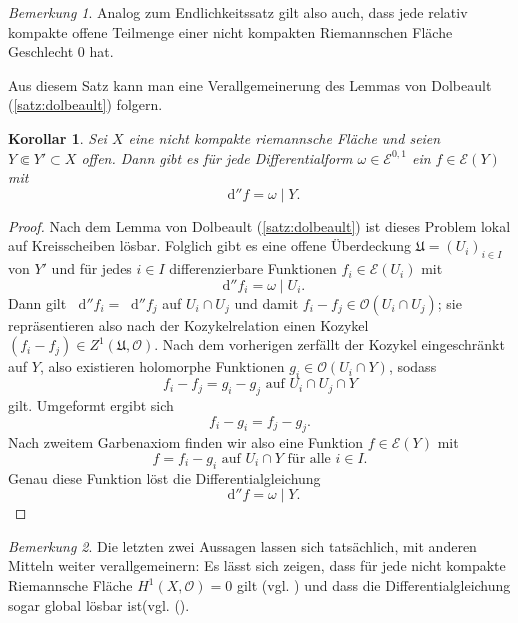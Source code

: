 \documentclass[11pt,a4paper,toc=bibliography]{scrartcl}
\theoremstyle{def}
\theoremstyle{thm}
\newtheorem{koro}[defi]{Korollar}
\theoremstyle{remark}
\newtheorem*{bem}{Bemerkung}
\newcommand*\dif{\mathop{}\!\mathrm{d}}\newcommand{\einschraenkung}{\,\rule[-5pt]{0.4pt}{12pt}\,{}} %
\begin{document}
\begin{bem}
Analog zum Endlichkeitssatz gilt also auch, dass jede relativ kompakte offene Teilmenge einer nicht kompakten Riemannschen Fläche Geschlecht 0 hat.
\end{bem}
Aus diesem Satz kann man eine Verallgemeinerung des Lemmas von Dolbeault (\ref{satz:dolbeault}) folgern.
\begin{koro}
Sei $X$ eine nicht kompakte riemannsche Fläche und seien $Y\Subset Y'\subset X$ offen. Dann gibt es für jede Differentialform $\omega \in \mathcal{E}^{0,1}$ ein $f\in \mathcal{E}(Y)$ mit 
\[
\dif ''f = \omega\mid Y.
\]
\end{koro}
\begin{proof}
	Nach dem Lemma von Dolbeault (\ref{satz:dolbeault}) ist dieses Problem lokal auf Kreisscheiben lösbar. Folglich gibt es eine offene Überdeckung $\mathfrak{U}=(U_i)_{i\in I}$ von $Y'$ und für jedes $i\in I$ differenzierbare Funktionen $f_i\in \mathcal{E}(U_i)$ mit \[
	\dif ''f_i = \omega \mid U_i.\] 
	Dann gilt $\dif '' f_i=\dif'' f_j$ auf $U_i\cap U_j$ und damit $f_i-f_j\in\mathcal{O}(U_i\cap U_j)$; sie repräsentieren also nach der Kozykelrelation einen Kozykel $(f_i-f_j)\in Z^1(\mathfrak{U},\mathcal{O})$. Nach dem vorherigen  zerfällt der Kozykel eingeschränkt auf $Y$, also existieren holomorphe Funktionen $g_i\in\mathcal{O}(U_i\cap Y)$, sodass
	\[
	f_i-f_j=g_i-g_j\text{ auf } U_i\cap U_j\cap Y
	\]
	gilt. Umgeformt ergibt sich
	\[
	f_i-g_i=f_j-g_j.
	\]
	 Nach zweitem Garbenaxiom finden wir also eine Funktion $f\in \mathcal{E}(Y)$ mit
	 \[
	 f=f_i-g_i\text{ auf }U_i\cap Y\text{ für alle }i\in I.
	 \]
	 Genau diese Funktion löst die Differentialgleichung
	 \[
	 \dif'' f=\omega\mid Y.\]
	 \end{proof}
\begin{bem}
	Die letzten zwei Aussagen lassen sich tatsächlich, mit anderen Mitteln weiter verallgemeinern:
    Es lässt sich zeigen, dass für jede nicht kompakte Riemannsche Fläche $H^1(X,\mathcal{O})=0$ gilt (vgl. \cite[~26.1]{forster}) und dass die Differentialgleichung sogar global lösbar ist(vgl. (\cite[~25.6]{forster}).
\end{bem}
\end{document}
